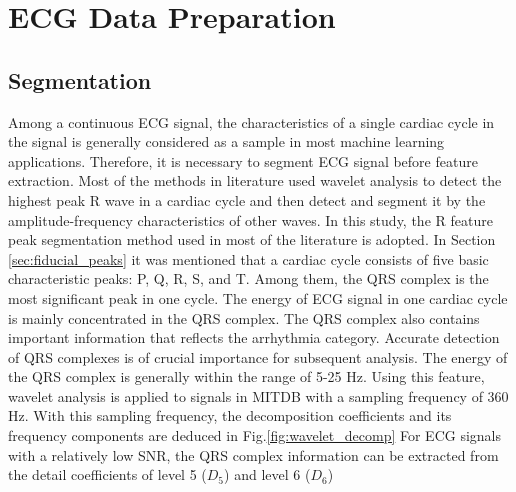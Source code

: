 
\section{ECG Data Preparation}

\subsection{Segmentation}

Among a continuous ECG signal, the characteristics of a single cardiac cycle in the signal is generally considered as a sample in most machine learning applications. Therefore, it is necessary to segment ECG signal before feature extraction. Most of the methods in literature used wavelet analysis to detect the highest peak R wave in a cardiac cycle and then detect and segment it by the amplitude-frequency characteristics of other waves. In this study, the R feature peak segmentation method used in most of the literature is adopted. In Section \ref{sec:fiducial_peaks} it was mentioned that a cardiac cycle consists of five basic characteristic peaks: P, Q, R, S, and T. Among them, the QRS complex is the most significant peak in one cycle. The energy of ECG signal in one cardiac cycle is mainly concentrated in the QRS complex. The QRS complex also contains important information that reflects the arrhythmia category\cite{2012qrs}. Accurate detection of QRS complexes is of crucial importance for subsequent analysis. The energy of the QRS complex is generally within the range of 5-25 Hz. Using this feature, wavelet analysis is applied to signals in MITDB with a sampling frequency of 360 Hz. With this sampling frequency, the decomposition coefficients and its frequency components are deduced in Fig.\ref{fig:wavelet_decomp} For ECG signals with a relatively low SNR, the QRS complex information can be extracted from the detail coefficients of level 5 ($D_5$) and level 6 ($D_6$)

